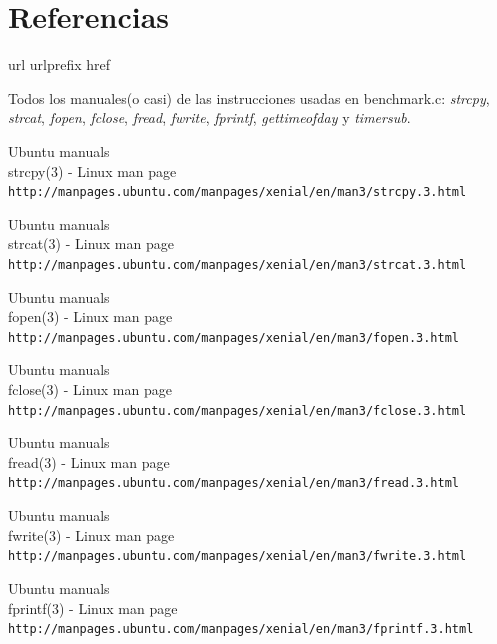 \documentclass[paper=a4, fontsize=11pt]{scrartcl} %
\numberwithin{equation}{section} %
\numberwithin{figure}{section} %
\numberwithin{table}{section} %
\begin{document}
\section{Referencias}
\begin{thebibliography}{10}
\expandafter\ifx\csname url\endcsname\relax
  \def\url#1{\texttt{#1}}\fi
\expandafter\ifx\csname urlprefix\endcsname\relax\def\urlprefix{URL}\fi
\expandafter\ifx\csname href\endcsname\relax
  \def\href#1#2{#2} \def\path#1{#1}\fi

Todos los manuales(o casi) de las instrucciones usadas en benchmark.c: \textit{strcpy}\cite{man_strcpy},
\textit{strcat}\cite{man_strcat}, \textit{fopen}\cite{man_fopen}, \textit{fclose}\cite{man_fclose},
\textit{fread}\cite{man_fread}, \textit{fwrite}\cite{man_fwrite}, \textit{fprintf}\cite{fprintf},
\textit{gettimeofday}\cite{man_gettimeofday} y \textit{timersub}\cite{man_timersub}.

Ubuntu manuals\\
strcpy(3) - Linux man page\\
  \url{http://manpages.ubuntu.com/manpages/xenial/en/man3/strcpy.3.html}

Ubuntu manuals\\
strcat(3) - Linux man page\\
  \url{http://manpages.ubuntu.com/manpages/xenial/en/man3/strcat.3.html}

Ubuntu manuals\\
fopen(3) - Linux man page\\
  \url{http://manpages.ubuntu.com/manpages/xenial/en/man3/fopen.3.html}

Ubuntu manuals\\
fclose(3) - Linux man page\\
  \url{http://manpages.ubuntu.com/manpages/xenial/en/man3/fclose.3.html}

Ubuntu manuals\\
fread(3) - Linux man page\\
  \url{http://manpages.ubuntu.com/manpages/xenial/en/man3/fread.3.html}

Ubuntu manuals\\
fwrite(3) - Linux man page\\
  \url{http://manpages.ubuntu.com/manpages/xenial/en/man3/fwrite.3.html}

Ubuntu manuals\\
fprintf(3) - Linux man page\\
  \url{http://manpages.ubuntu.com/manpages/xenial/en/man3/fprintf.3.html}


\end{thebibliography}
\end{document}
